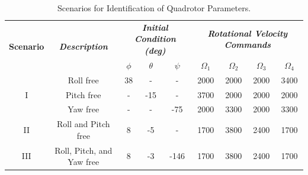 \documentclass[3p,times]{elsarticle}
\begin{document}
\begin{table}[H]
	\caption{Scenarios for Identification of Quadrotor Parameters.}
	\centering
	\begin{tabular}{*{9}{c}}
	\toprule
	\multirow{2}{*}{\textbf{Scenario}} & \multirow{2}{*}{\textbf{\textit{Description}}}
	& \multicolumn{3}{c}{\textbf{\textit{Initial Condition (deg)}}} &
	\multicolumn{4}{c}{\textbf{\textit{Rotational Velocity Commands}}} \\
	\cmidrule(lr){3-5} \cmidrule(lr){6-9}
	& & $\phi$ & $\theta$ & $\psi$ & $\Omega_1$ & $\Omega_2$ & $\Omega_3$ & $\Omega_4$\\
	\midrule
	\multirow{3}{*}{I} & Roll free & 38 & - & - & 2000 & 2000 & 2000 & 3400\\
	& Pitch free & - & -15 & - & 3700 & 2000 & 2000 & 2000 \\
	& Yaw free & -& - &-75 & 2000 & 3300 & 2000 & 3300 \\
	\midrule
	II & Roll and Pitch free &8 & -5 & - & 1700 & 3800 & 2400 & 1700\\
	\midrule
	III & Roll, Pitch, and Yaw free &
	8 & -3 & -146 & 1700 & 3800 & 2400 & 1700 \\
	\bottomrule
	\end{tabular}
	\label{tab:identification}
\end{table}
\end{document}
